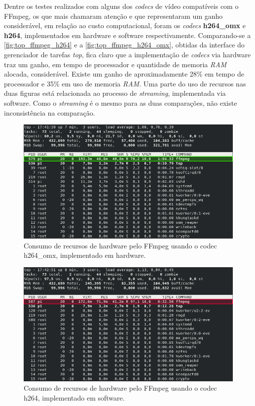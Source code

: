 Dentre os testes realizados com alguns dos \textit{codecs} de vídeo compatíveis com o FFmpeg, os que mais chamaram atenção e que representaram um ganho considerável, em relação ao custo computacional, foram os \textit{codecs} \textbf{h264\_omx} e \textbf{h264}, implementados em hardware e software respectivamente.
Comparando-se a \autoref{fig:top_ffmpeg_h264} e a \autoref{fig:top_ffmpeg_h264_omx}, obtidas da interface do gerenciador de tarefas \textit{top}, fica claro que a implementação de \textit{codecs} via hardware traz um ganho, em tempo de processador e quantidade de memoria \textit{RAM} alocada, considerável. Existe um ganho de aproximadamente 28\% em tempo de processador e 35\% em uso de memoria \textit{RAM}. Uma parte do uso de recursos nas duas figuras está relacionada ao processo de \textit{streaming}, implementada via software. Como o \textit{streaming} é o mesmo para as duas comparações, não existe inconsistência na comparação.

\begin{figure}[H]
	\centering
	\includegraphics[width=1\textwidth]{figuras/top_ffmpeg_h264_omx.png}
	\caption{Consumo de recursos de hardware pelo FFmpeg usando o codec h264\_omx, implementado em hardware.}
	\label{fig:top_ffmpeg_h264_omx}
\end{figure}

\begin{figure}[H]
	\centering
	\includegraphics[width=1\textwidth]{figuras/top_ffmpeg_h264.png}
	\caption{Consumo de recursos de hardware pelo FFmpeg usando o codec h264, implementado em software.}
	\label{fig:top_ffmpeg_h264}
\end{figure}
